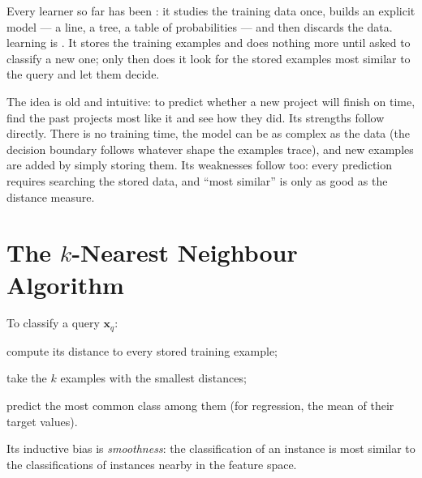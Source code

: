 Every learner so far has been : it studies the training data once,
builds an explicit model --- a line, a tree, a table of probabilities --- and then
discards the data.  learning is . It stores the
training examples and does nothing more until asked to classify a new one; only
then does it look for the stored examples most similar to the query and let them
decide.

The idea is old and intuitive: to predict whether a new project will finish on
time, find the past projects most like it and see how they did. Its strengths follow directly.
There is no training time, the model can be as complex as the data (the decision
boundary follows whatever shape the examples trace), and new examples are added
by simply storing them. Its weaknesses follow too: every prediction requires
searching the stored data, and ``most similar'' is only as good as the distance
measure.

\section{The $k$-Nearest Neighbour Algorithm}

\begin{definitionbox}
To classify a query $\mathbf{x}_q$:
\begin{tightnum}
  \item compute its distance to every stored training example;
  \item take the $k$ examples with the smallest distances;
  \item predict the most common class among them (for regression, the mean of
        their target values).
\end{tightnum}
Its inductive bias is \emph{smoothness}: the classification of an instance is
most similar to the classifications of instances nearby in the feature space.
\end{definitionbox}

